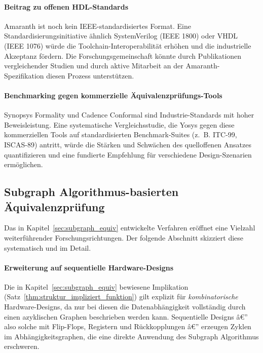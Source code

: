 ﻿\documentclass[12pt,a4paper]{report}
\begin{document}
\paragraph{Beitrag zu offenen HDL-Standards}
Amaranth ist noch kein IEEE-standardisiertes Format. Eine Standardisierungsinitiative
ähnlich SystemVerilog (IEEE 1800) oder VHDL (IEEE 1076) würde die Toolchain-Interoperabilität
erhöhen und die industrielle Akzeptanz fördern. Die Forschungsgemeinschaft könnte durch
Publikationen vergleichender Studien und durch aktive Mitarbeit an der Amaranth-
Spezifikation diesen Prozess unterstützen.

\paragraph{Benchmarking gegen kommerzielle Äquivalenzprüfungs-Tools}
Synopsys Formality und Cadence Conformal sind Industrie-Standards mit hoher
Beweisleistung. Eine systematische Vergleichsstudie, die Yosys gegen diese kommerziellen
Tools auf standardisierten Benchmark-Suites (z.~B. ITC-99, ISCAS-89) antritt, würde
die Stärken und Schwächen des quelloffenen Ansatzes quantifizieren und eine fundierte
Empfehlung für verschiedene Design-Szenarien ermöglichen.

\subsection{Subgraph Algorithmus-basierten Äquivalenzprüfung}

Das in Kapitel~\ref{sec:subgraph_equiv} entwickelte Verfahren eröffnet eine Vielzahl
weiterführender Forschungsrichtungen. Der folgende Abschnitt skizziert diese
systematisch und im Detail.

\paragraph{Erweiterung auf sequentielle Hardware-Designs}

Die in Kapitel~\ref{sec:subgraph_equiv} bewiesene Implikation (Satz~\ref{thm:struktur_impliziert_funktion})
gilt explizit für \emph{kombinatorische} Hardware-Designs, da nur bei diesen die
Datenabhängigkeit vollständig durch einen azyklischen Graphen beschrieben werden kann.
Sequentielle Designs â€” also solche mit Flip-Flops, Registern und Rückkopplungen â€” erzeugen
Zyklen im Abhängigkeitsgraphen, die eine direkte Anwendung des Subgraph Algorithmus
erschweren.
\end{document}
